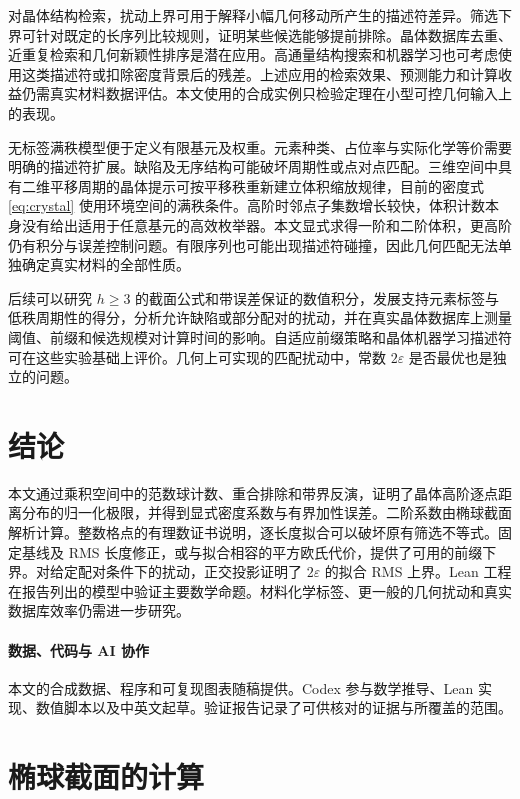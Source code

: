 \documentclass[11pt,a4paper,UTF8,fontset=fandol]{ctexart}
\theoremstyle{definition}
\begin{document}
对晶体结构检索，扰动上界可用于解释小幅几何移动所产生的描述符差异。筛选下界可针对既定的长序列比较规则，证明某些候选能够提前排除。晶体数据库去重、近重复检索和几何新颖性排序是潜在应用。高通量结构搜索和机器学习也可考虑使用这类描述符或扣除密度背景后的残差。上述应用的检索效果、预测能力和计算收益仍需真实材料数据评估。本文使用的合成实例只检验定理在小型可控几何输入上的表现。

无标签满秩模型便于定义有限基元及权重。元素种类、占位率与实际化学等价需要明确的描述符扩展。缺陷及无序结构可能破坏周期性或点对点匹配。三维空间中具有二维平移周期的晶体提示可按平移秩重新建立体积缩放规律，目前的密度式 \eqref{eq:crystal} 使用环境空间的满秩条件。高阶时邻点子集数增长较快，体积计数本身没有给出适用于任意基元的高效枚举器。本文显式求得一阶和二阶体积，更高阶仍有积分与误差控制问题。有限序列也可能出现描述符碰撞，因此几何匹配无法单独确定真实材料的全部性质。

后续可以研究 \(h\ge3\) 的截面公式和带误差保证的数值积分，发展支持元素标签与低秩周期性的得分，分析允许缺陷或部分配对的扰动，并在真实晶体数据库上测量阈值、前缀和候选规模对计算时间的影响。自适应前缀策略和晶体机器学习描述符可在这些实验基础上评价。几何上可实现的匹配扰动中，常数 \(2\varepsilon\) 是否最优也是独立的问题。

\section{结论}\label{sec:conclusion}

本文通过乘积空间中的范数球计数、重合排除和带界反演，证明了晶体高阶逐点距离分布的归一化极限，并得到显式密度系数与有界加性误差。二阶系数由椭球截面解析计算。整数格点的有理数证书说明，逐长度拟合可以破坏原有筛选不等式。固定基线及 RMS 长度修正，或与拟合相容的平方欧氏代价，提供了可用的前缀下界。对给定配对条件下的扰动，正交投影证明了 \(2\varepsilon\) 的拟合 RMS 上界。Lean 工程在报告列出的模型中验证主要数学命题。材料化学标签、更一般的几何扰动和真实数据库效率仍需进一步研究。

\paragraph{数据、代码与 AI 协作}
本文的合成数据、程序和可复现图表随稿提供。Codex 参与数学推导、Lean 实现、数值脚本以及中英文起草。验证报告记录了可供核对的证据与所覆盖的范围。

\appendix
\section{椭球截面的计算}\label{app:ellipse}
\end{document}
